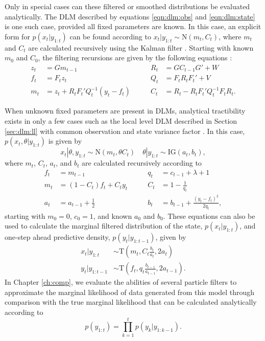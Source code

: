Only in special cases can these filtered or smoothed distributions be evaluated analytically. The DLM described by equations \eqref{eqn:dlm:obs} and \eqref{eqn:dlm:state} is one such case, provided all fixed parameters are known. In this case, an explicit form for $p(x_t|y_{1:t})$ can be found according to $x_t|y_{1:t} \sim \mbox{N}(m_t,C_t)$, where $m_t$ and $C_t$ are calculated recursively using the Kalman filter \citep{kal:1960:ekf}. Starting with known $m_0$ and $C_0$, the filtering recursions are given by the following equations \cite[Section 2.7.2][]{petris:camp:2009:dynamic}:
\begin{align}
z_t &= Gm_{t-1} &\qquad R_t &= GC_{t-1}G' + W \label{eqn:dlm:kal} \\
f_t &= F_tz_t &\qquad Q_t &= F_tR_tF_t' + V \nonumber \\
m_t &= z_t + R_tF_t'Q_t^{-1}(y_t-f_t) &\qquad C_t &= R_t - R_tF_t'Q_t^{-1}F_tR_t. \nonumber
\end{align}

When unknown fixed parameters are present in DLMs, analytical tractibility exists in only a few cases such as the local level DLM described in Section \ref{sec:dlm:ll} with common observation and state variance factor \cite[Section 4.3][]{petris:camp:2009:dynamic}. In this case, $p(x_t,\theta|y_{1:t})$ is given by
\begin{equation}
x_t|\theta,y_{1:t} \sim \mbox{N}(m_t,\theta C_t) \quad \theta|y_{1:t} \sim \mbox{IG}(a_t, b_t), \label{eqn:ll:post}
\end{equation}
where $m_t$, $C_t$, $a_t$, and $b_t$ are calculated recursively according to
\begin{align}
f_t &= m_{t-1} &\qquad q_t &= c_{t-1} + \lambda + 1 \label{eqn:ll:kal} \\
m_t &= (1 - C_t)f_t + C_ty_t &\qquad C_t &= 1 - \frac{1}{q_t} \nonumber \\
a_t &= a_{t-1} + \frac{1}{2} &\qquad b_t &= b_{t-1} + \frac{(y_t-f_t)^2}{2q_t}, \nonumber
\end{align}
starting with $m_0 = 0$, $c_0 = 1$, and known $a_0$ and $b_0$. These equations can also be used to calculate the marginal filtered distribution of the state, $p(x_t|y_{1:t})$, and one-step ahead predictive density, $p(y_t|y_{1:t-1})$, given by
\begin{align}
x_t|y_{1:t} &\sim \mbox{T}\left(m_t,C_t \frac{b_t}{a_t},2a_t\right) \label{eqn:ll:marg} \\
y_t|y_{1:t-1} &\sim \mbox{T}\left(f_t,q_t \frac{b_{t-1}}{a_{t-1}},2a_{t-1}\right). \label{eqn:ll:onestep}
\end{align}
In Chapter \ref{ch:comp}, we evaluate the abilities of several particle filters to approximate the marginal likelihood of data generated from this model through comparison with the true marginal likelihood that can be calculated analytically according to
\begin{equation}
p(y_{1:t}) = \prod_{k=1}^t p(y_k|y_{1:k-1}) \label{eqn:ll:marglik}.
\end{equation}

